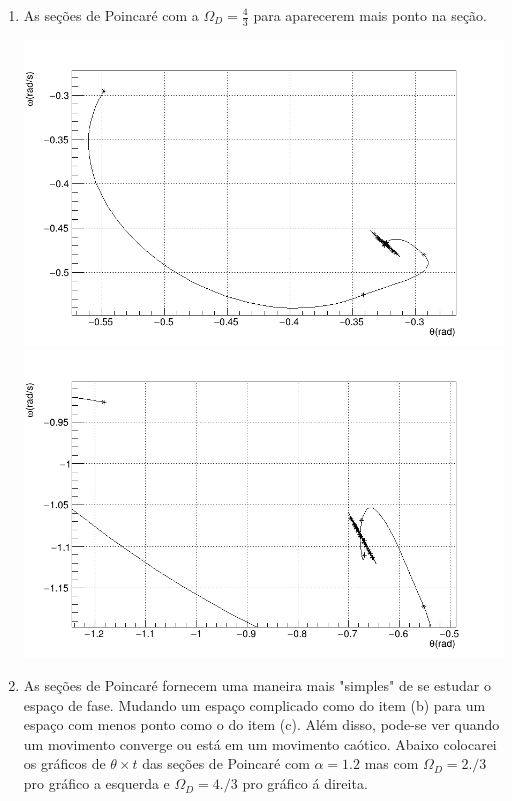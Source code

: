 \documentclass[main.tex]{subfiles}
\begin{document}
\begin{enumerate}[label=\textbf{\alph*)}]
\begin{center}
    \end{center}
    \item As seções de Poincaré com a $\Omega_D = \frac{4}{3}$ para aparecerem mais ponto na seção.
    \begin{center}
        \includegraphics[scale=0.15]{../q2/itemd/alpha0.5/plots/poincare_RK.png}
        \includegraphics[scale=0.15]{../q2/itemd/alpha1.2/plots/poincare_RK.png}
    \end{center}
    \item As seções de Poincaré fornecem uma maneira mais "simples" de se estudar o espaço de fase. Mudando um espaço complicado como do item (b) para um espaço com menos ponto como o do item (c). Além disso, pode-se ver quando
    um movimento converge ou está em um movimento caótico. Abaixo colocarei os gráficos de $\theta \times t$ das seções de Poincaré com $\alpha = 1.2$ mas com $\Omega_D = 2./3$ pro gráfico a esquerda e $\Omega_D = 4./3$ pro gráfico á direita.

\end{enumerate}
\end{document}
